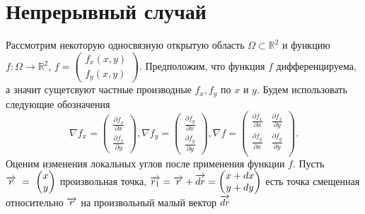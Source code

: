\section{Непрерывный случай}
\label{sec:continious}

Рассмотрим некоторую односвязную открытую область $\Omega \subset \mathbb{R}^2$ и функцию 
$f: \Omega \to \mathbb{R}^2$, $f = \begin{pmatrix} f_x(x, y) \\ f_y(x, y) \end{pmatrix}$. 
Предположим, что функция $f$ дифференцируема, а значит сущетсвуют частные производные $f_x, f_y$ по $x$ и $y$. 
Будем использовать следующие обозначения
$$
  \nabla f_x = \begin{pmatrix} \frac{\partial f_x}{\partial x} \\ \frac{\partial f_x}{\partial y} \end{pmatrix}, 
  \nabla f_y = \begin{pmatrix} \frac{\partial f_y}{\partial x} \\ \frac{\partial f_y}{\partial y} \end{pmatrix}, 
  \nabla f = \begin{pmatrix} 
    \frac{\partial f_x}{\partial x} & \frac{\partial f_x}{\partial y} \\
    \frac{\partial f_y}{\partial x} & \frac{\partial f_y}{\partial y} \\
  \end{pmatrix}. 
$$
Оценим изменения локальных углов после применения функции $f$.
Пусть $\overrightarrow{r}~=~\begin{pmatrix} x \\ y \end{pmatrix}$ произвольная точка, 
$\overrightarrow{r_1} = \overrightarrow{r} + \overrightarrow{dr} = \begin{pmatrix} x + dx \\ y + dy \end{pmatrix}$ есть точка смещенная относительно $\overrightarrow{r}$ на произвольный малый вектор $\overrightarrow{dr}$
